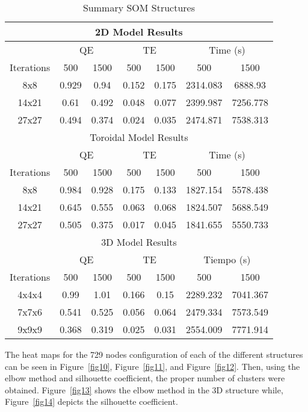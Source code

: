\documentclass[conference]{IEEEtran}
\begin{document}
\begin{table}[!t]
\renewcommand{\arraystretch}{1.3}
\caption{Summary SOM Structures}
\label{table9}
\centering
\begin{tabular}{c || c | c | c | c | c | c}
\hline
\multicolumn{7}{c}{2D Model Results} \\ 
\hline
 & \multicolumn{2}{c|}{QE} & \multicolumn{2}{c|}{TE} & \multicolumn{2}{c}{Time (s)} \\ 
\hline
\hline

Iterations & 500 & 1500 & 500 & 1500 & 500 & 1500 \\ 
8x8 & 0.929 & 0.94 & 0.152 & 0.175 & 2314.083 & 6888.93 \\ 
14x21 & 0.61 & 0.492 & 0.048 & 0.077 & 2399.987 & 7256.778 \\ 
27x27 & 0.494 & 0.374 & 0.024 & 0.035 & 2474.871 & 7538.313 \\ 

\hline

\multicolumn{7}{c}{Toroidal Model Results} \\ 
\hline
 & \multicolumn{2}{c|}{QE} & \multicolumn{2}{c|}{TE} & \multicolumn{2}{c}{Time (s)} \\ 
\hline
\hline

Iterations & 500 & 1500 & 500 & 1500 & 500 & 1500 \\ 	
8x8 & 0.984 & 0.928 & 0.175 & 0.133 & 1827.154 & 5578.438 \\ 	
14x21 & 0.645 & 0.555 & 0.063 & 0.068 & 1824.507 & 5688.549 \\ 	
27x27 & 0.505 & 0.375 & 0.017 & 0.045 & 1841.655 & 5550.733 \\ 	

\multicolumn{7}{c}{3D Model Results} \\ 
\hline
 & \multicolumn{2}{c|}{QE} & \multicolumn{2}{c|}{TE} & \multicolumn{2}{c}{Tiempo (s)} \\ 
\hline
\hline

Iterations & 500 & 1500 & 500 & 1500 & 500 & 1500 \\ 
4x4x4 & 0.99 & 1.01 & 0.166 & 0.15 & 2289.232 & 7041.367 \\ 
7x7x6 & 0.541 & 0.525 & 0.056 & 0.064 & 2479.334 & 7573.549 \\ 
9x9x9 & 0.368 & 0.319 & 0.025 & 0.031 & 2554.009 & 7771.914 \\ 

\end{tabular}
\end{table}

The heat maps for the 729 nodes configuration of each of the different structures can be seen in Figure~\ref{fig10}, Figure~\ref{fig11}, and Figure~\ref{fig12}. Then, using the elbow method and silhouette coefficient, the proper number of clusters were obtained. Figure~\ref{fig13} shows the elbow method in the 3D structure while, 
Figure~\ref{fig14} depicts the silhouette coefficient.
\end{document}
